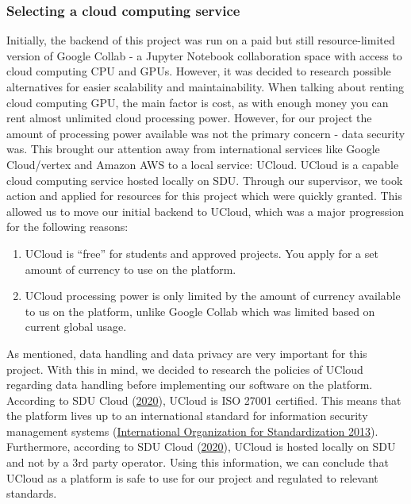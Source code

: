 \documentclass[
]{article}
\begin{document}
\hypertarget{selecting-a-cloud-computing-service}{%
\subsubsection{Selecting a cloud computing
service}\label{selecting-a-cloud-computing-service}}

Initially, the backend of this project was run on a paid but still
resource-limited version of Google Collab - a Jupyter Notebook
collaboration space with access to cloud computing CPU and GPUs.
However, it was decided to research possible alternatives for easier
scalability and maintainability. When talking about renting cloud
computing GPU, the main factor is cost, as with enough money you can
rent almost unlimited cloud processing power. However, for our project
the amount of processing power available was not the primary concern -
data security was. This brought our attention away from international
services like Google Cloud/vertex and Amazon AWS to a local service:
UCloud. UCloud is a capable cloud computing service hosted locally on
SDU. Through our supervisor, we took action and applied for resources
for this project which were quickly granted. This allowed us to move our
initial backend to UCloud, which was a major progression for the
following reasons:

\begin{enumerate}
\def\labelenumi{\arabic{enumi}.}
\item
  UCloud is ``free'' for students and approved projects. You apply for a
  set amount of currency to use on the platform.
\item
  UCloud processing power is only limited by the amount of currency
  available to us on the platform, unlike Google Collab which was
  limited based on current global usage.
\end{enumerate}

As mentioned, data handling and data privacy are very important for this
project. With this in mind, we decided to research the policies of
UCloud regarding data handling before implementing our software on the
platform. According to SDU Cloud
(\protect\hyperlink{ref-UCloud_Security}{2020}), UCloud is ISO 27001
certified. This means that the platform lives up to an international
standard for information security management systems
(\protect\hyperlink{ref-iso27001}{International Organization for
Standardization 2013}). Furthermore, according to SDU Cloud
(\protect\hyperlink{ref-UCloud_Security}{2020}), UCloud is hosted
locally on SDU and not by a 3rd party operator. Using this information,
we can conclude that UCloud as a platform is safe to use for our project
and regulated to relevant standards.
\end{document}
